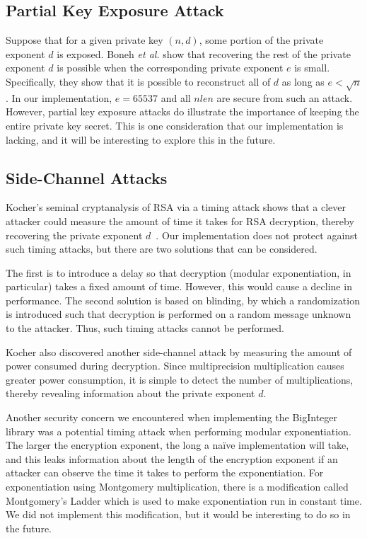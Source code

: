 \documentclass[a4paper]{article}
\begin{document}
\subsection{Partial Key Exposure Attack}

Suppose that for a given private key $(n,d)$, some portion of the private exponent $d$ is exposed. Boneh \emph{et al.} show that recovering the rest of the private exponent $d$ is possible when the corresponding private exponent $e$ is small. Specifically, they show that it is possible to reconstruct all of $d$ as long as $e < \sqrt{n}$. In our implementation, $e = 65537$ and all $nlen$ are secure from such an attack. However, partial key exposure attacks do illustrate the importance
of keeping the entire private key secret. This is one consideration that our implementation is lacking, and it will be interesting to explore this in the future.

\subsection{Side-Channel Attacks}

Kocher's seminal cryptanalysis of RSA via a timing attack shows that a clever attacker could measure the amount of time it takes for RSA decryption, thereby recovering the private exponent $d$~\cite{kocher1996timing}. Our implementation does not protect against such timing attacks, but there are two solutions that can be considered.

The first is to introduce a delay so that decryption (modular exponentiation, in particular) takes a fixed amount of time. However, this would cause a decline in performance. The second solution is based on blinding, by which a randomization is introduced such that decryption is performed on a random message unknown to the attacker. Thus, such timing attacks cannot be performed.

Kocher also discovered another side-channel attack by measuring the amount of power consumed during decryption. Since multiprecision multiplication causes greater power consumption, it is simple to detect the number of multiplications, thereby revealing information about the private exponent $d$. 

Another security concern we encountered when implementing the BigInteger library was a potential timing attack when performing modular exponentiation. The larger the encryption exponent, the long a na\"{i}ve implementation will take, and this leaks information about the length of the encryption exponent if an attacker can observe the time it takes to perform the exponentiation. For exponentiation using Montgomery multiplication, there is a modification called Montgomery’s Ladder which is used to make exponentiation run in constant time. We did not implement this modification, but it would be interesting to do so in the future.
\end{document}
